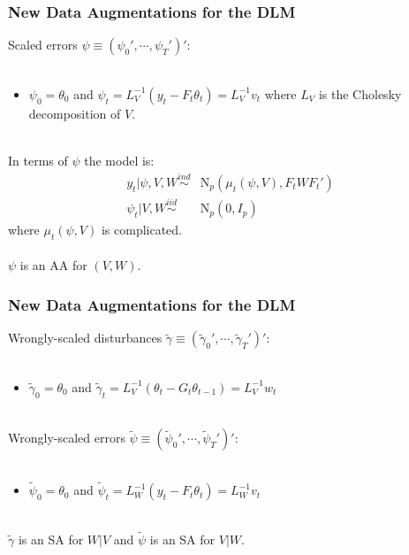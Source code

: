 \documentclass[xcolor=dvipsnames]{beamer}
\newcommand\N{\mathrm{N}}
\begin{document}
\begin{frame}
\frametitle{New Data Augmentations for the DLM}
Scaled errors $\psi\equiv(\psi_0',\cdots,\psi_T')'$:\\~\\
\begin{itemize}
\item[]$\psi_0=\theta_0$ and $\psi_t=L_V^{-1}(y_t - F_t\theta_t)=L_V^{-1}v_t$ where $L_V$ is the Cholesky decomposition of $V$.\\~\\
\end{itemize}
 
In terms of $\psi$ the model is:
\begin{align*}
y_t|\psi,V,W \stackrel{ind}{\sim} &\N_p(\mu_t(\psi,V),F_tWF_t')\\
\psi_t|V,W \stackrel{iid}{\sim} &\N_p(0,I_p)
\end{align*} 
where $\mu_t(\psi,V)$ is complicated.\\~\\

{\color{blue}$\psi$ is an AA for $(V,W)$.}
\end{frame}

\begin{frame}
\frametitle{New Data Augmentations for the DLM}
Wrongly-scaled disturbances $\tilde{\gamma}\equiv(\tilde{\gamma}_0',\cdots,\tilde{\gamma}_T')'$:\\~\\
\begin{itemize}
\item[]$\tilde{\gamma}_0=\theta_0$ and $\tilde{\gamma}_t=L_V^{-1}(\theta_t - G_t\theta_{t-1})=L_V^{-1}w_t$\\~\\
\end{itemize}

Wrongly-scaled errors $\tilde{\psi}\equiv(\tilde{\psi}_0',\cdots,\tilde{\psi}_T')'$:\\~\\
\begin{itemize}
\item[]$\tilde{\psi}_0=\theta_0$ and $\tilde{\psi}_t=L_W^{-1}(y_t - F_t\theta_{t})=L_W^{-1}v_t$\\~\\
\end{itemize}

{\color{blue} $\tilde{\gamma}$ is an SA for $W|V$ and $\tilde{\psi}$ is an SA for $V|W$.}
\end{frame}
\end{document}
